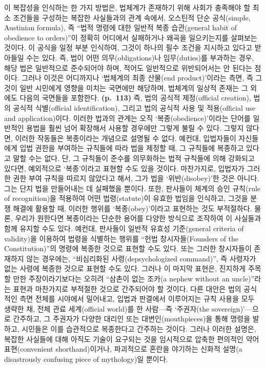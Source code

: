 이 복잡성을 인식하는 한 가지 방법은, 법체계가 존재하기 위해 사회가
충족해야 할 최소 조건들을 구성하는 복잡한 사실들과의 관계 속에서,
오스틴적 단순 공식(simple, Austinian formula), 즉 ``법적 명령에 대한
일반적 복종 습관(general habit of obedience to orders)''이 정확히
어디에서 실패하거나 왜곡을 일으키는지를 살펴보는 것이다. 이 공식을 일정
부분 인식하여, 그것이 하나의 필수 조건을 지시하고 있다고 받아들일 수는
있다. 즉, 법이 어떤 의무(obligations)나 임무(duties)를 부과하는 경우,
해당 법은 일반적으로 준수되어야 하며, 적어도 일반적으로 위반되어서는 안
된다는 점이다. 그러나 이것은 어디까지나 `법체계의 최종 산물(end
product)'이라는 측면, 즉 그것이 일반 시민에게 영향을 미치는 국면에만
해당하며, 법체계의 일상적 존재는 그 외에도 다음의 국면들을 포함한다.
\textbf{(p.~113)} 즉, 법의 공식적 제정(official creation), 법의 공식적
식별(official identification), 그리고 법의 공식적 사용 및 적용(official
use and application)이다. 이러한 법과의 관계는 오직
`복종(obedience)'이라는 단어를 일반적인 용법을 훨씬 넘어 확장해서 사용할
경우에만 그렇게 불릴 수 있다. 그렇지 않다면, 이러한 작동들은 복종이라는
개념으로 설명될 수 없다. 예컨대, 입법자들이 자신들에게 입법 권한을
부여하는 규칙들에 따라 법을 제정할 때, 그 규칙들에 복종하고 있다고 말할
수는 없다. 단, 그 규칙들이 준수를 의무화하는 법적 규칙들에 의해 강화되고
있다면, 예외적으로 `복종'이라고 표현할 수도 있을 것이다. 마찬가지로,
입법자가 그러한 권한 부여 규칙을 따르지 않았다고 해서, 그가 법을
`위반(disobey)'한 것은 아니다. 그는 단지 법을 만들어내는 데 실패했을
뿐이다. 또한, 판사들이 체계의 승인 규칙(rule of recognition)을 적용하여
어떤 법령(statute)이 유효한 법임을 인식하고, 그것을 분쟁 해결에 활용할
때, 이러한 행위를 `복종(obey)'이라고 표현하는 것도 부적절하다. 물론,
우리가 원한다면 복종이라는 단순한 용어를 다양한 방식으로 조작하여 이
사실들과 함께 유지할 수도 있다. 예컨대, 판사들이 일반적 유효성
기준(general criteria of validity)을 이용하여 법령을 식별하는 행위를
``헌법 창시자들(Founders of the Constitution)''의 명령에 복종한 것으로
표현할 수도 있다. 또는 그러한 창시자들이 존재하지 않는 경우에는,
``비심리화된 사령(depsychologized command)'', 즉 사령자가 없는 사령에
복종한 것으로 표현할 수도 있다. 그러나 이 마지막 표현은, 진지하게 주목할
만한 주장이라기보다는 오히려 ``삼촌이 없는 조카(a nephew without an
uncle)''라는 표현과 마찬가지로 부적절한 것으로 간주되어야 할 것이다.
다른 대안은 법의 공식적인 측면 전체를 시야에서 밀어내고, 입법과 판결에서
이루어지는 규칙 사용을 모두 생략한 채, 전체 관료 세계(official world)를
한 사람---즉 `주권자(the sovereign)'---으로 간주하고, 그 주권자가 다양한
대리인 또는 대변인(mouthpieces)을 통해 명령을 발하고, 시민들은 이를
습관적으로 복종한다고 간주하는 것이다. 그러나 이러한 설명은, 복잡한
사실들에 대해 아직도 기술이 요구되는 것을 임시적으로 압축한 편의적인
약어 표현(convenient shorthand)이거나, 파괴적으로 혼란을 야기하는 신화적
설명(a disastrously confusing piece of mythology)일 뿐이다.

